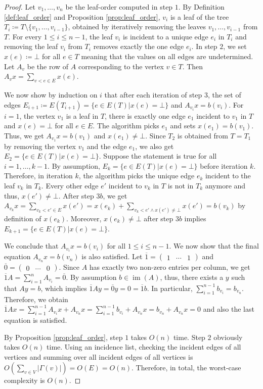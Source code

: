 \documentclass[english,a4paper,nolineno,cleveref]{socg-lipics-v2021}
\DeclareMathOperator{\im}{im}
\begin{document}
\begin{proof}
Let $v_1,\ldots,v_n$ be the leaf-order computed in step $1$. By Definition \ref{def:leaf_order} and Proposition \ref{prop:leaf_order}, $v_i$ is a leaf of the tree $T_i\coloneqq T\setminus \{v_1,\ldots,v_{i\minus 1}\}$, obtained by iteratively removing the leaves $v_1,\ldots,v_{i\minus 1}$ from $T$. For every $1\leq i\leq n-1$, the leaf $v_i$ is incident to a unique edge $e_i$ in $T_i$ and removing the leaf $v_i$ from $T_i$ removes exactly the one edge $e_i$. In step $2$, we set $x(e)\coloneqq\bot$ for all $e\in T$ meaning that the values on all edges are undetermined. Let $A_v$ be the row of $A$ corresponding to the vertex $v\in T$. Then $A_{v} x=\sum_{v<e\in E}x(e)$.

We now show by induction on $i$ that after each iteration of step $3$, the set of edges $E_{i+1}\coloneqq E(T_{i+1})=\{e\in E(T)\vert x(e)=\bot\}$ and $A_{v_i}x=b(v_i)$. For $i=1$, the vertex $v_1$ is a leaf in $T$, there is exactly one edge $e_1$ incident to $v_1$ in $T$ and $x(e)=\bot$ for all $e\in E$. The algorithm picks $e_1$ and sets $x(e_1)=b(v_1)$. Thus, we get $A_{v_1}x=b(v_1)$ and $x(e_1)\neq\bot$. Since $T_2$ is obtained from $T=T_1$ by removing the vertex $v_1$ and the edge $e_1$, we also get $E_2=\{e\in E(T)\vert x(e)=\bot\}$. Suppose the statement is true for all $i=1,\ldots,k-1$. By assumption, $E_k=\{e\in E(T)\vert x(e)=\bot\}$ before iteration $k$. Therefore, in iteration $k$, the algorithm picks the unique edge $e_k$ incident to the leaf $v_k$ in $T_k$. Every other edge $e'$ incident to $v_k$ in $T$ is not in $T_k$ anymore and thus, $x(e')\neq\bot$. After step $3b$, we get $A_{v_k}x=\underset{v_k<e'\in E}{\sum}x(e')=x(e_k)+\underset{v_k<e'\wedge x(e')\neq \bot}{\sum}x(e')=b(v_k)$ by definition of $x(e_k)$. Moreover, $x(e_k)\neq\bot$ after step $3b$ implies $E_{k+1}=\{e\in E(T)\vert x(e)=\bot\}$.  

We conclude that $A_{v_i}x=b(v_i)$ for all $1\leq i\leq n-1$. We now show that the final equation $A_{v_n}x=b(v_n)$ is also satisfied. Let $\overline{1}=\begin{pmatrix}1&\cdots&1\end{pmatrix}$ and $\overline{0}=\begin{pmatrix}0&\cdots&0\end{pmatrix}$. Since $A$ has exactly two non-zero entries per column, we get $\overline{1}A=\sum_{i=1}^n A_{v_i}=\overline{0}$. By assumption $b\in\im(A)$, thus, there exists a $y$ such that $Ay=b$, which implies $\overline{1}Ay=\overline{0}y=0=\overline{1}b$. In particular, $\sum_{i=1}^{n-1}b_{v_i}=b_{v_n}$. Therefore, we obtain $\overline{1}Ax=\sum_{i=1}^{n-1}A_{v_i}x+A_{v_n}x=\sum_{i=1}^{n-1}b_{v_i}+A_{v_n}x=b_{v_n}+A_{v_n}x=0$ and also the last equation is satisfied.

By Proposition \ref{prop:leaf_order}, step $1$ takes $O(n)$ time. Step $2$ obviously takes $O(n)$ time. Using an incidence list, checking the incident edges of all vertices and summing over all incident edges of all vertices is $O(\sum_{v\in V}\vert\Gamma(v)\vert)=O(E)=O(n)$. Therefore, in total, the worst-case complexity is $O(n)$. 
\end{proof}
\end{document}
